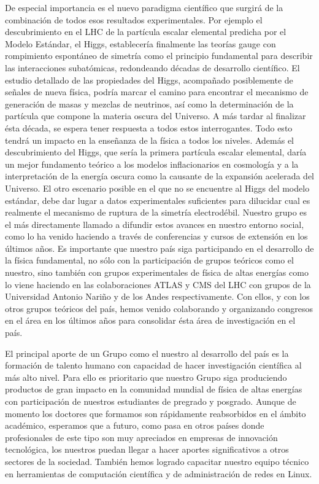 De especial importancia es el nuevo paradigma científico que surgirá
de la combinación de todos esos resultados experimentales. Por ejemplo
el descubrimiento en el LHC de la partícula escalar elemental predicha
por el Modelo Estándar, el Higgs, establecería finalmente las teorías
gauge con rompimiento espontáneo de simetría como el principio
fundamental para describir las interacciones subatómicas, redondeando
décadas de desarrollo científico.  El estudio detallado de las
propiedades del Higgs, acompañado posiblemente de señales
de nueva física, podría marcar el camino para encontrar el mecanismo
de generación de masas y mezclas de neutrinos, así como la
determinación de la partícula que compone la materia oscura del
Universo. A más tardar al finalizar ésta década, se espera tener
respuesta a todos estos interrogantes. Todo esto tendrá un impacto en la
enseñanza de la física a todos los niveles. Además el descubrimiento
del Higgs, que sería la primera partícula escalar elemental, daría un
mejor fundamento teórico a los modelos inflacionarios en cosmología y
a la interpretación de la energía oscura como la causante de la
expansión acelerada del Universo. El otro escenario posible en el que
no se encuentre al Higgs del modelo estándar, debe dar lugar a datos
experimentales suficientes para dilucidar cual es realmente el
mecanismo de ruptura de la simetría electrodébil. Nuestro grupo es el
más directamente llamado a difundir estos avances en nuestro entorno social,
como lo ha venido haciendo a través de conferencias y cursos de
extensión en los últimos años. Es importante que nuestro país siga
participando en el desarrollo de la física fundamental, no sólo con la
participación de grupos teóricos como el nuestro, sino también con
grupos experimentales de física de altas energías como lo viene
haciendo en las colaboraciones ATLAS y CMS del LHC con grupos de la
Universidad Antonio Nariño y de los Andes respectivamente. Con ellos,
y con los otros grupos teóricos del país, hemos venido colaborando y
organizando congresos en el área en los últimos años para consolidar
ésta área de investigación en el país.

El principal aporte de un Grupo como el nuestro al desarrollo del país
es la formación de talento humano con capacidad de hacer investigación
científica al más alto nivel. Para ello es prioritario que nuestro
Grupo siga produciendo productos de gran impacto en la comunidad
mundial de física de altas energías con participación de nuestros
estudiantes de pregrado y posgrado.  Aunque de momento los doctores
que formamos son rápidamente reabsorbidos en el ámbito académico,
esperamos que a futuro, como pasa en otros países donde profesionales
de este tipo son muy apreciados en empresas de innovación tecnológica,
los nuestros puedan llegar a hacer aportes significativos a otros
sectores de la sociedad. También hemos logrado capacitar nuestro
equipo técnico en herramientas de computación científica y de
administración de redes en Linux.


